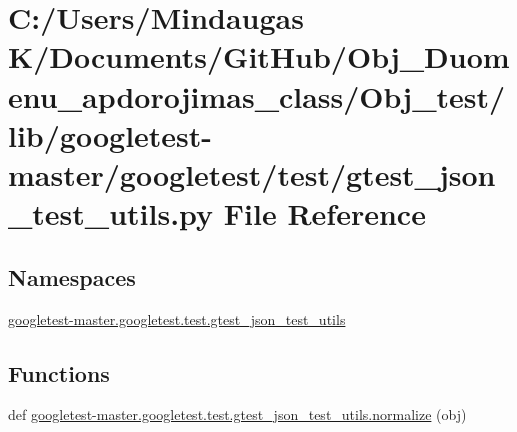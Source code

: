 \hypertarget{_obj__test_2lib_2googletest-master_2googletest_2test_2gtest__json__test__utils_8py}{}\section{C\+:/\+Users/\+Mindaugas K/\+Documents/\+Git\+Hub/\+Obj\+\_\+\+Duomenu\+\_\+apdorojimas\+\_\+class/\+Obj\+\_\+test/lib/googletest-\/master/googletest/test/gtest\+\_\+json\+\_\+test\+\_\+utils.py File Reference}
\label{_obj__test_2lib_2googletest-master_2googletest_2test_2gtest__json__test__utils_8py}
\subsection*{Namespaces}
\begin{DoxyCompactItemize}
\item 
 \mbox{\hyperlink{namespacegoogletest-master_1_1googletest_1_1test_1_1gtest__json__test__utils}{googletest-\/master.\+googletest.\+test.\+gtest\+\_\+json\+\_\+test\+\_\+utils}}
\end{DoxyCompactItemize}
\subsection*{Functions}
\begin{DoxyCompactItemize}
\item 
def \mbox{\hyperlink{namespacegoogletest-master_1_1googletest_1_1test_1_1gtest__json__test__utils_a4d47d93af2a7ae4ec52c8ca37a9965b8}{googletest-\/master.\+googletest.\+test.\+gtest\+\_\+json\+\_\+test\+\_\+utils.\+normalize}} (obj)
\end{DoxyCompactItemize}
